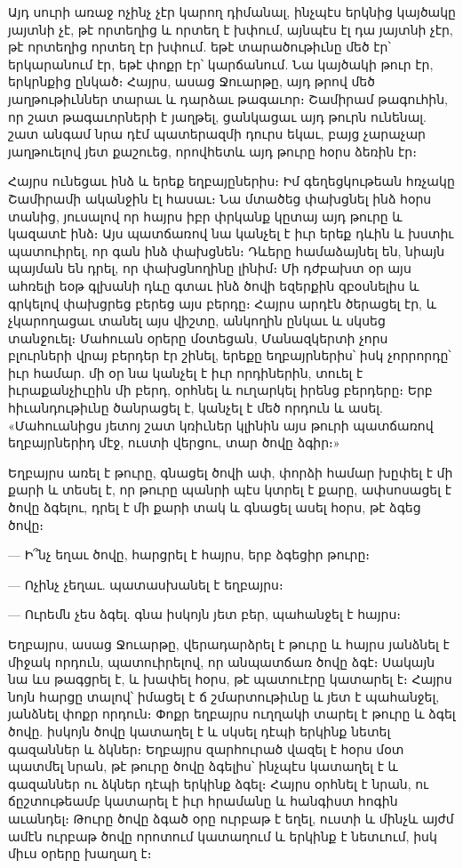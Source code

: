 \documentclass{article}
\begin{document}
{Այդ սուրի առաջ ոչինչ չէր կարող դիմանալ, ինչպէս երկնից կայծակը յայտնի չէ, թէ որտեղից և որտեղ է խփում, այնպէս էլ դա յայտնի չէր, թէ որտեղից որտեղ էր խփում. եթէ տարածութիւնը մեծ էր՝ երկարանում էր, եթէ փոքր էր՝ կարճանում. Նա կայծակի թուր էր, երկրնքից ընկած։ Հայրս, ասաց Ջուարթը, այդ թրով մեծ յաղթութիւններ տարաւ և դարձաւ թագաւոր։ Շամիրամ թագուհին, որ շատ թագաւորների է յաղթել, ցանկացաւ այդ թուրն ունենալ. շատ անգամ նրա դէմ պատերազմի դուրս եկաւ, բայց չարաչար յաղթուելով յետ քաշուեց, որովհետև այդ թուրը հօրս ձեռին էր։

Հայրս ունեցաւ ինձ և երեք եղբայըներիս։ Իմ գեղեցկութեան հռչակը Շամիրամի ականջին էլ հասաւ։ Նա մտածեց փախցնել ինձ հօրս տանից, յուսալով որ հայրս իբր փրկանք կըտայ այդ թուրը և կազատէ ինձ։ Այս պատճառով նա կանչել է իւր երեք դևին և խստիւ պատուիրել, որ գան ինձ փախցնեն։ Դևերը համաձայնել են, նիայն պայման են դրել, որ փախցնողինը լինիմ։ Մի դժբախտ օր այս ահռելի եօթ գլխանի դևը գտաւ ինձ ծովի եզերքին զբօսնելիս և գրկելով փախցրեց բերեց այս բերդը։ Հայրս արդէն ծերացել էր, և չկարողացաւ տանել այս վիշտը, անկողին ընկաւ և սկսեց տանջուել։ Մահուան օրերը մօտեցան, Մանազկերտի չորս բլուրների վրայ բերդեր էր շինել, երեքը եղբայրներիս՝ իսկ չորրորդը՝ իւր համար. մի օր նա կանչել է իւր որդիներին, տուել է իւրաքանչիւըին մի բերդ, օրհնել և ուղարկել իրենց բերդերը։ Երբ հիւանդութիւնը ծանրացել է, կանչել է մեծ որդուն և ասել. «Մահուանիցս յետոյ շատ կռիւներ կլինին այս թուրի պատճառով եղբայրներիդ մէջ, ուստի վերցու, տար ծովը ձգիր։»

Եղբայրս առել է թուրը, գնացել ծովի ափ, փորձի համար խըփել է մի քարի և տեսել է, որ թուրը պանրի պէս կտրել է քարը, ափսոսացել է ծովը ձգելու, դրել է մի քարի տակ և գնացել ասել հօրս, թէ ձգեց ծովը։

— Ի՞նչ եղաւ ծովը, հարցրել է հայրս, երբ ձգեցիր թուրը։

— Ոչինչ չեղաւ. պատասխանել է եղբայրս։

— Ուրեմն չես ձգել. գնա իսկոյն յետ բեր, պահանջել է հայրս։

Եղբայրս, ասաց Ջուարթը, վերադարձրել է թուրը և հայրս յանձնել է միջակ որդուն, պատուիրելով, որ անպատճառ ծովը ձգէ։ Սակայն նա ևս թագցրել է, և խափել հօրս, թէ պատուէրը կատարել է։ Հայրս նոյն հարցը տալով՝ իմացել է ճ շմարտութիւնը և յետ է պահանջել, յանձնել փոքր որդուն։ Փոքր եղբայրս ուղղակի տարել է թուրը և ձգել ծովը. իսկոյն ծովը կատաղել է և սկսել դէպի երկինք նետել գազաններ և ձկներ։ Եղբայրս զարհուրած վազել է հօրս մօտ պատմել նրան, թէ թուրը ծովը ձգելիս՝ ինչպէս կատաղել է և գազաններ ու ձկներ դէպի երկինք ձգել։ Հայրս օրհնել է նրան, ու ճըշտութեամբ կատարել է իւր հրամանը և հանգիստ հոգին աւանդել։ Թուրը ծովը ձգած օրը ուրբաթ է եղել, ուստի և մինչև այժմ ամէն ուրբաթ ծովը որոտում կատաղում և երկինք է նետւում, իսկ միւս օրերը խաղաղ է։

}
\end{document}
